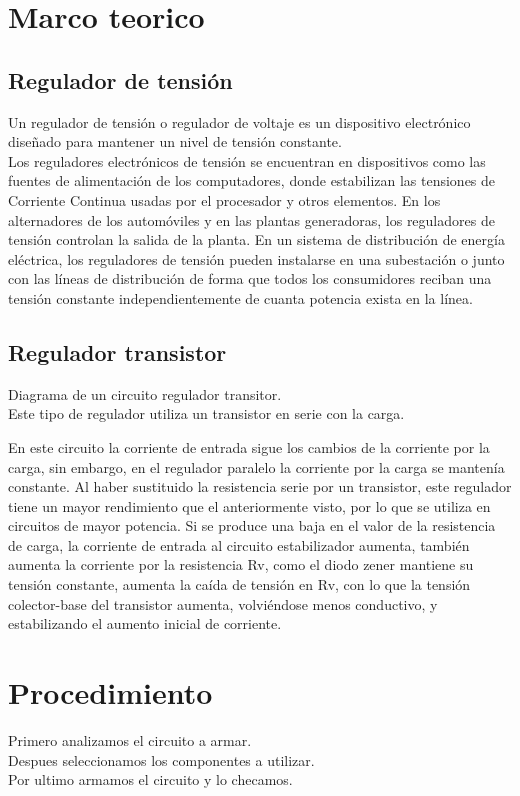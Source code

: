 \documentclass[12pt,a4paper]{article}
\begin{document}
\section{Marco teorico}
\subsection{Regulador de tensión}
Un regulador de tensión o regulador de voltaje es un dispositivo electrónico diseñado para mantener un nivel de tensión constante. \\
Los reguladores electrónicos de tensión se encuentran en dispositivos como las fuentes de alimentación de los computadores, donde estabilizan las tensiones de Corriente Continua usadas por el procesador y otros elementos. En los alternadores de los automóviles y en las plantas generadoras, los reguladores de tensión controlan la salida de la planta. En un sistema de distribución de energía eléctrica, los reguladores de tensión pueden instalarse en una subestación o junto con las líneas de distribución de forma que todos los consumidores reciban una tensión constante independientemente de cuanta potencia exista en la línea.

\subsection{Regulador transistor}
Diagrama de un circuito regulador transitor.\\
Este tipo de regulador utiliza un transistor en serie con la carga.

En este circuito la corriente de entrada sigue los cambios de la corriente por la carga, sin embargo, en el regulador paralelo la corriente por la carga se mantenía constante. Al haber sustituido la resistencia serie por un transistor, este regulador tiene un mayor rendimiento que el anteriormente visto, por lo que se utiliza en circuitos de mayor potencia. Si se produce una baja en el valor de la resistencia de carga, la corriente de entrada al circuito estabilizador aumenta, también aumenta la corriente por la resistencia Rv, como el diodo zener mantiene su tensión constante, aumenta la caída de tensión en Rv, con lo que la tensión colector-base del transistor aumenta, volviéndose menos conductivo, y estabilizando el aumento inicial de corriente.
\newpage
\section{Procedimiento}
Primero analizamos el circuito a armar.\\
Despues seleccionamos los componentes a utilizar.\\
Por ultimo armamos el circuito y lo checamos.\\
 
\end{document}

